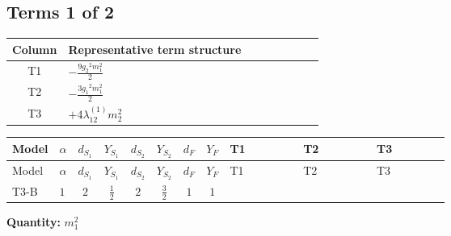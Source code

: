 \documentclass[8pt]{article}
\begin{document}
\begin{landscape}
\subsection*{Terms 1 of 2}
\begin{center}
\begin{tabular}{@{}c >{\raggedright\arraybackslash}p{0.82\linewidth}@{}}
\toprule
Column & Representative term structure \\
\midrule
T1 & \(\displaystyle -\frac{9 {g_2}^2 {m_1^2}}{2}\) \\
\midrule
T2 & \(\displaystyle -\frac{3 {g_1}^2 {m_1^2}}{2}\) \\
\midrule
T3 & \(\displaystyle +4 {\lambda_{12}^{(1)}} {m_2^2}\) \\
\midrule
\bottomrule
\end{tabular}
\end{center}
\smallskip
\tiny
\begin{longtable}{@{}llcccccc >{\raggedright\arraybackslash}p{0.21\linewidth} >{\raggedright\arraybackslash}p{0.21\linewidth} >{\raggedright\arraybackslash}p{0.21\linewidth}@{}}
\toprule
Model & $\alpha$ & $d_{S_1}$ & $Y_{S_1}$ & $d_{S_2}$ & $Y_{S_2}$ & $d_F$ & $Y_F$ & T1 & T2 & T3 \\
\midrule
\endfirsthead
\toprule
Model & $\alpha$ & $d_{S_1}$ & $Y_{S_1}$ & $d_{S_2}$ & $Y_{S_2}$ & $d_F$ & $Y_F$ & T1 & T2 & T3 \\
\midrule
\endhead
T3-B & $1$ & $2$ & $\frac{1}{2}$ & $2$ & $\frac{3}{2}$ & $1$ & $1$ & \scriptsize\adjustbox{max width=\linewidth}{$\begin{gathered} -\frac{9 {g_2}^2 {m_1^2}}{2}\end{gathered}$} & \scriptsize\adjustbox{max width=\linewidth}{$\begin{gathered} -\frac{3 {g_1}^2 {m_1^2}}{2}\end{gathered}$} & \scriptsize\adjustbox{max width=\linewidth}{$\begin{gathered} +4 {\lambda_{12}^{(1)}} {m_2^2}\end{gathered}$} \\
\midrule
\bottomrule
\end{longtable}
\clearpage
\noindent\textbf{Quantity: }$m_1^2$\par\smallskip

\end{landscape}
\end{document}

